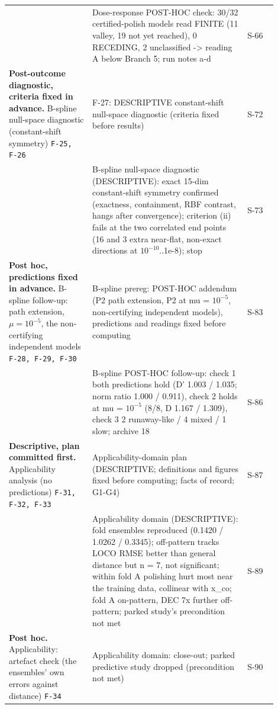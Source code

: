 {\begin{longtable}{R{0.28\linewidth} R{0.52\linewidth} R{0.10\linewidth}}
 & Dose-response POST-HOC check: 30/32 certified-polish models read FINITE (11 valley, 19 not yet reached), 0 RECEDING, 2 unclassified -> reading A below Branch 5; run notes a-d & S-66 \\
\textbf{Post-outcome diagnostic, criteria fixed in advance.} B-spline null-space diagnostic (constant-shift symmetry) \newline \footnotesize{\texttt{F-25, F-26}} & F-27: DESCRIPTIVE constant-shift null-space diagnostic (criteria fixed before results) & S-72 \\
 & B-spline null-space diagnostic (DESCRIPTIVE): exact 15-dim constant-shift symmetry confirmed (exactness, containment, RBF contrast, hangs after convergence); criterion (ii) fails at the two correlated end points (16 and 3 extra near-flat, non-exact directions at $10^{-10}$..1e-8); stop & S-73 \\
\textbf{Post hoc, predictions fixed in advance.} B-spline follow-up: path extension, $\mu = 10^{-5}$, the non-certifying independent models \newline \footnotesize{\texttt{F-28, F-29, F-30}} & B-spline prereg: POST-HOC addendum (P2 path extension, P2 at mu = $10^{-5}$, non-certifying independent models), predictions and readings fixed before computing & S-83 \\
 & B-spline POST-HOC follow-up: check 1 both predictions hold (D' 1.003 / 1.035; norm ratio 1.000 / 0.911), check 2 holds at mu = $10^{-5}$ (8/8, D 1.167 / 1.309), check 3 2 runaway-like / 4 mixed / 1 slow; archive 18 & S-86 \\
\textbf{Descriptive, plan committed first.} Applicability analysis (no predictions) \newline \footnotesize{\texttt{F-31, F-32, F-33}} & Applicability-domain plan (DESCRIPTIVE; definitions and figures fixed before computing; facts of record; G1-G4) & S-87 \\
 & Applicability domain (DESCRIPTIVE): fold ensembles reproduced (0.1420 / 1.0262 / 0.3345); off-pattern tracks LOCO RMSE better than general distance but n = 7, not significant; within fold A polishing hurt most near the training data, collinear with x\_co; fold A on-pattern, DEC 7x further off-pattern; parked study's precondition not met & S-89 \\
\textbf{Post hoc.} Applicability: artefact check (the ensembles' own errors against distance) \newline \footnotesize{\texttt{F-34}} & Applicability domain: close-out; parked predictive study dropped (precondition not met) & S-90 \\

\end{longtable}}
